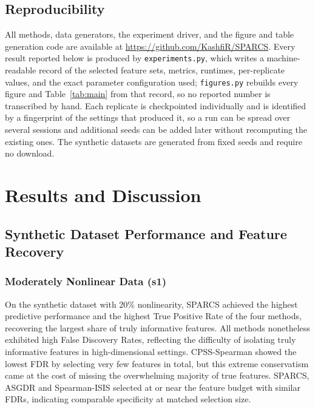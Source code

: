 \documentclass[11pt]{article}
\begin{document}
\subsection{Reproducibility}

All methods, data generators, the experiment driver, and the figure and table generation code are
available at \url{https://github.com/KashfiR/SPARCS}. Every result reported below is produced by
\texttt{experiments.py}, which writes a machine-readable record of the selected feature sets,
metrics, runtimes, per-replicate values, and the exact parameter configuration used;
\texttt{figures.py} rebuilds every figure and Table~\ref{tab:main} from that record, so no reported
number is transcribed by hand. Each replicate is checkpointed individually and is identified by a
fingerprint of the settings that produced it, so a run can be spread over several sessions and
additional seeds can be added later without recomputing the existing ones. The synthetic datasets are
generated from fixed seeds and require no download.

\section{Results and Discussion}

\begin{table}[H]
\centering
\caption{Method performance across the four benchmark datasets.}
\label{tab:main}
\small
{}
\end{table}

\subsection{Synthetic Dataset Performance and Feature Recovery}

\subsubsection{Moderately Nonlinear Data (s1)}

On the synthetic dataset with 20\% nonlinearity, SPARCS achieved the highest predictive performance
and the highest True Positive Rate of the four methods, recovering the largest share of truly
informative features. All methods nonetheless exhibited high False Discovery Rates, reflecting the
difficulty of isolating truly informative features in high-dimensional settings. CPSS-Spearman
showed the lowest FDR by selecting very few features in total, but this extreme conservatism came at
the cost of missing the overwhelming majority of true features. SPARCS, ASGDR and Spearman-ISIS
selected at or near the feature budget with similar FDRs, indicating comparable specificity at
matched selection size.
\end{document}
